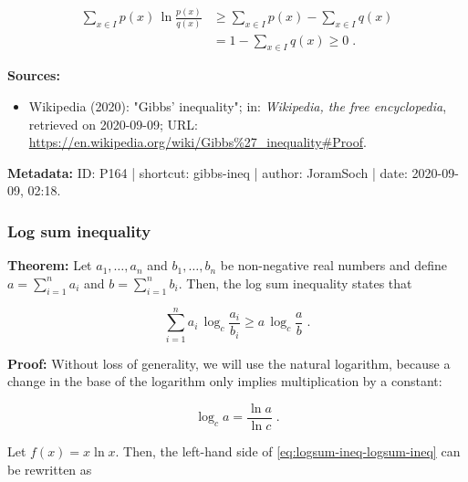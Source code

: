 \documentclass[a4paper,12pt,twoside]{book}
\begin{document}
\begin{equation} \label{eq:gibbs-ineq-Gibbs-ineq-s3}
\begin{split}
\sum_{x \in I} p(x) \, \ln \frac{p(x)}{q(x)} &\geq \sum_{x \in I} p(x) - \sum_{x \in I} q(x) \\
&= 1 - \sum_{x \in I} q(x) \geq 0 \; .
\end{split}
\end{equation}


\vspace{1em}
\textbf{Sources:}
\begin{itemize}
\item Wikipedia (2020): "Gibbs' inequality"; in: \textit{Wikipedia, the free encyclopedia}, retrieved on 2020-09-09; URL: \url{https://en.wikipedia.org/wiki/Gibbs%27_inequality#Proof}.
\end{itemize}


\vspace{1em}
\textbf{Metadata:} ID: P164 | shortcut: gibbs-ineq | author: JoramSoch | date: 2020-09-09, 02:18.
\vspace{1em}



\subsubsection[\textbf{Log sum inequality}]{Log sum inequality} \label{sec:logsum-ineq}
\setcounter{equation}{0}

\textbf{Theorem:} Let $a_1, \ldots, a_n$ and $b_1, \ldots, b_n$ be non-negative real numbers and define $a = \sum_{i=1}^{n} a_i$ and $b = \sum_{i=1}^{n} b_i$. Then, the log sum inequality states that

\begin{equation} \label{eq:logsum-ineq-logsum-ineq}
\sum_{i=1}^n a_i \, \log_c \frac{a_i}{b_i} \geq a \, \log_c \frac{a}{b} \; .
\end{equation}


\vspace{1em}
\textbf{Proof:} Without loss of generality, we will use the natural logarithm, because a change in the base of the logarithm only implies multiplication by a constant:

\begin{equation} \label{eq:logsum-ineq-log-ln}
\log_c a = \frac{\ln a}{\ln c} \; .
\end{equation}

Let $f(x) = x \ln x$. Then, the left-hand side of \eqref{eq:logsum-ineq-logsum-ineq} can be rewritten as
\end{document}
